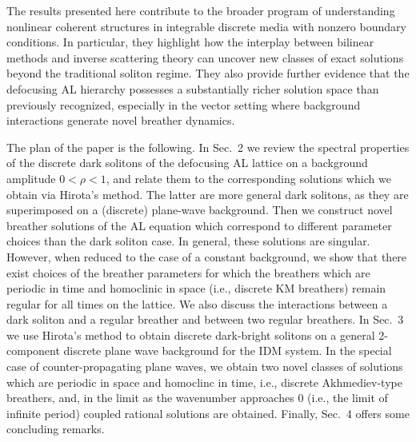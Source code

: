 \documentclass{article}
\begin{document}
The results presented here contribute to the broader program of understanding nonlinear coherent structures in integrable discrete media with nonzero boundary conditions. In particular, they highlight how the interplay between bilinear methods and inverse scattering theory can uncover new classes of exact solutions beyond the traditional soliton regime. They also provide further evidence that the defocusing AL hierarchy possesses a substantially richer solution space than previously recognized, especially in the vector setting where background interactions generate novel breather dynamics.

The plan of the paper is the following. In Sec.~2 we review the spectral properties of the discrete dark solitons of the defocusing AL lattice on a background amplitude $0<\rho<1$, and relate them to the corresponding solutions which we obtain via Hirota's method. The latter are more general dark solitons, as they are superimposed on a (discrete) plane-wave background. Then we construct novel breather solutions of the AL equation which correspond to different parameter choices than the dark soliton case. In general, these solutions are singular. However, when reduced to the case of a constant background, we show that there exist choices of the breather parameters for which the breathers which are periodic in time and homoclinic in space (i.e., discrete KM breathers) remain regular for all times on the lattice.  We also discuss the interactions between a dark soliton and a regular breather and between two regular breathers. In Sec.~3 we use Hirota's method to obtain discrete dark-bright solitons on a general 2-component discrete plane wave background for the IDM system. In the special case of counter-propagating plane waves, we obtain two novel classes of solutions which are periodic in space and homoclinc in time, i.e., discrete Akhmediev-type breathers, and, in the limit as the wavenumber approaches 0 (i.e., the limit of infinite period) coupled rational solutions are obtained. Finally, Sec.~4 offers some concluding remarks.

\end{document}
